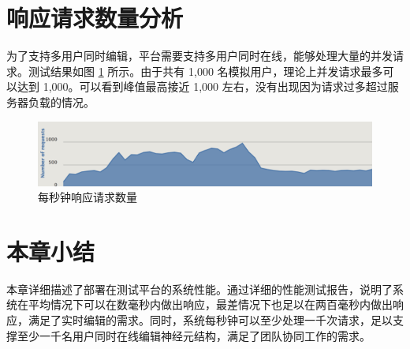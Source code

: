 \section{响应请求数量分析}
为了支持多用户同时编辑，平台需要支持多用户同时在线，能够处理大量的并发请求。测试结果如图 \ref{requests} 所示。由于共有 1,000 名模拟用户，理论上并发请求最多可以达到 1,000。可以看到峰值最高接近 1,000 左右，没有出现因为请求过多超过服务器负载的情况。

\begin{figure}[!ht]
\centering
\includegraphics[width=148mm]{images/num-res}
\caption{每秒钟响应请求数量}
\label{requests}
\end{figure}

\section{本章小结}
本章详细描述了部署在测试平台的系统性能。通过详细的性能测试报告，说明了系统在平均情况下可以在数毫秒内做出响应，最差情况下也足以在两百毫秒内做出响应，满足了实时编辑的需求。同时，系统每秒钟可以至少处理一千次请求，足以支撑至少一千名用户同时在线编辑神经元结构，满足了团队协同工作的需求。




